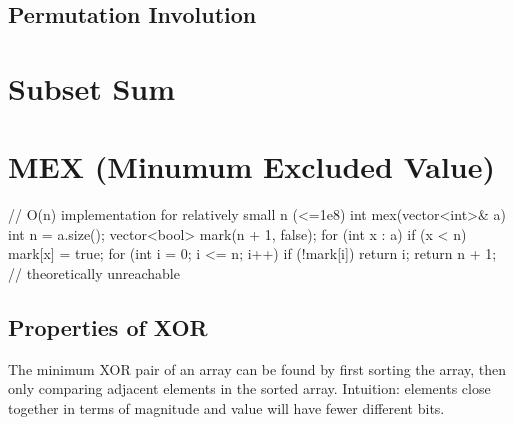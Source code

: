 \documentclass[12pt]{extarticle}
\begin{document}
\subsection*{Permutation Involution}

\newpage
\section*{Subset Sum}
\section*{MEX (Minumum Excluded Value)}
\begin{cpp}
// O(n) implementation for relatively small n (<=1e8)
int mex(vector<int>& a) {
	int n = a.size();
	vector<bool> mark(n + 1, false);
	for (int x : a) {
		if (x < n) mark[x] = true;
	}
	for (int i = 0; i <= n; i++) {
		if (!mark[i]) return i;
	}
	return n + 1; // theoretically unreachable
}
\end{cpp}
\subsection*{Properties of XOR}
The minimum XOR pair of an array can be found by first sorting the array, then only comparing adjacent elements in the sorted array. Intuition: elements close together in terms of magnitude and value will have fewer different bits. 
\end{document}
